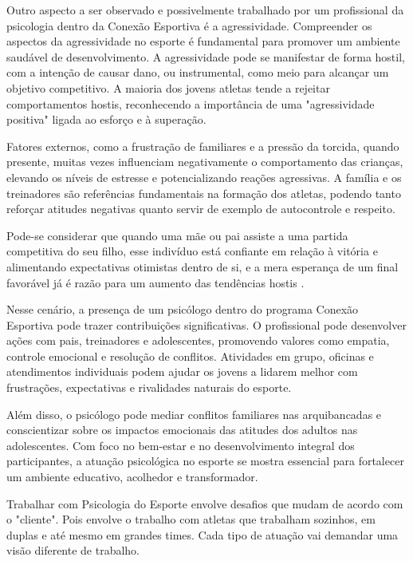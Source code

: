 \begin{Desenvolvimento}
Outro aspecto a ser observado e possivelmente trabalhado por um profissional da psicologia dentro da Conexão Esportiva é a agressividade. Compreender os aspectos da agressividade no esporte é fundamental para promover um ambiente saudável de desenvolvimento. A agressividade pode se manifestar de forma hostil, com a intenção de causar dano, ou instrumental, como meio para alcançar um objetivo competitivo. A maioria dos jovens atletas tende a rejeitar comportamentos hostis, reconhecendo a importância de uma "agressividade positiva" ligada ao esforço e à superação. 

Fatores externos, como a frustração de familiares e a pressão da torcida, quando presente, muitas vezes influenciam negativamente o comportamento das crianças, elevando os níveis de estresse e potencializando reações agressivas. A família e os treinadores são referências fundamentais na formação dos atletas, podendo tanto reforçar atitudes negativas quanto servir de exemplo de autocontrole e respeito. 

\begin{citacaodiretalonga}
Pode-se considerar que quando uma mãe ou pai assiste a uma partida competitiva do seu filho, esse indivíduo está confiante em relação à vitória e alimentando expectativas otimistas dentro de si, e a mera esperança de um final favorável já é razão para um aumento das tendências hostis .
\end{citacaodiretalonga}

Nesse cenário, a presença de um psicólogo dentro do programa Conexão Esportiva pode trazer contribuições significativas. O profissional pode desenvolver ações com pais, treinadores e adolescentes, promovendo valores como empatia, controle emocional e resolução de conflitos. Atividades em grupo, oficinas e atendimentos individuais podem ajudar os jovens a lidarem melhor com frustrações, expectativas e rivalidades naturais do esporte.

Além disso, o psicólogo pode mediar conflitos familiares nas arquibancadas e conscientizar sobre os impactos emocionais das atitudes dos adultos nas adolescentes. Com foco no bem-estar e no desenvolvimento integral dos participantes, a atuação psicológica no esporte se mostra essencial para fortalecer um ambiente educativo, acolhedor e transformador.

Trabalhar com Psicologia do Esporte envolve desafios que mudam de acordo com o "cliente".  Pois envolve o trabalho com atletas que trabalham sozinhos, em duplas e até mesmo em grandes times. Cada tipo de atuação vai demandar uma visão diferente de trabalho. 


\end{Desenvolvimento}
